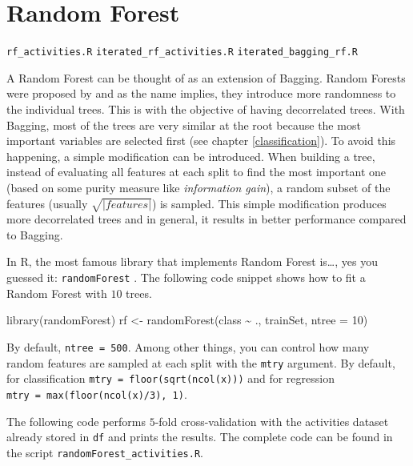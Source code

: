 \documentclass[
  11pt,
]{krantz}
\makeatletter
\newenvironment{Shaded}{\begin{snugshade}}{\end{snugshade}}
\newcommand{\AttributeTok}[1]{\textcolor[rgb]{0.61,0.61,0.61}{#1}}
\newcommand{\DecValTok}[1]{\textcolor[rgb]{0.06,0.06,0.06}{#1}}
\newcommand{\FunctionTok}[1]{\textcolor[rgb]{0,0,0}{#1}}
\newcommand{\NormalTok}[1]{#1}
\newcommand{\OtherTok}[1]{\textcolor[rgb]{0.37,0.37,0.37}{#1}}
\newcommand{\SpecialCharTok}[1]{\textcolor[rgb]{0,0,0}{#1}}
\newenvironment{kframe}{%
\medskip{}
\setlength{\fboxsep}{.8em}
 \def\at@end@of@kframe{}%
 \ifinner\ifhmode%
  \def\at@end@of@kframe{\end{minipage}}%
  \begin{minipage}{\columnwidth}%
 \fi\fi%
 \def\FrameCommand##1{\hskip\@totalleftmargin \hskip-\fboxsep
 \colorbox{shadecolor}{##1}\hskip-\fboxsep
     \hskip-\linewidth \hskip-\@totalleftmargin \hskip\columnwidth}%
 \MakeFramed {\advance\hsize-\width
   \@totalleftmargin\z@ \linewidth\hsize
   \@setminipage}}%
 {\par\unskip\endMakeFramed%
 \at@end@of@kframe}
\newenvironment{rmdblock}[1]
  {
  \begin{itemize}
  \renewcommand{\labelitemi}{
    \raisebox{-.7\height}[0pt][0pt]{
      {\setkeys{Gin}{width=3em,keepaspectratio}\texttt{[image: images/icons/\#1]}}
    }
  }
  \setlength{\fboxsep}{1em}
  \begin{kframe}
  \item
  }
  {
  \end{kframe}
  \end{itemize}
  }
\newenvironment{rmdfolder}
  {\begin{rmdblock}{folder}}
  {\end{rmdblock}}
\makeatother
\begin{document}
\hypertarget{random-forest}{%
\section{Random Forest}\label{random-forest}}

\begin{rmdfolder}
\texttt{rf\_activities.R} \texttt{iterated\_rf\_activities.R} \texttt{iterated\_bagging\_rf.R}
\end{rmdfolder}

A Random Forest can be thought of as an extension of Bagging. Random Forests were proposed by \citet{breimanRF} and as the name implies, they introduce more randomness to the individual trees. This is with the objective of having decorrelated trees. With Bagging, most of the trees are very similar at the root because the most important variables are selected first (see chapter \ref{classification}). To avoid this happening, a simple modification can be introduced. When building a tree, instead of evaluating all features at each split to find the most important one (based on some purity measure like \emph{information gain}), a random subset of the features (usually \(\sqrt{|features|}\)) is sampled. This simple modification produces more decorrelated trees and in general, it results in better performance compared to Bagging.

In R, the most famous library that implements Random Forest is\ldots, yes you guessed it: \texttt{randomForest} \citep{randomForest}. The following code snippet shows how to fit a Random Forest with \(10\) trees.

\begin{Shaded}
\begin{Highlighting}[]
\FunctionTok{library}\NormalTok{(randomForest)}
\NormalTok{rf }\OtherTok{\textless{}{-}} \FunctionTok{randomForest}\NormalTok{(class }\SpecialCharTok{\textasciitilde{}}\NormalTok{ ., trainSet, }\AttributeTok{ntree =} \DecValTok{10}\NormalTok{)}
\end{Highlighting}
\end{Shaded}

By default, \texttt{ntree\ =\ 500}. Among other things, you can control how many random features are sampled at each split with the \texttt{mtry} argument. By default, for classification \texttt{mtry\ =\ floor(sqrt(ncol(x)))} and for regression \texttt{mtry\ =\ max(floor(ncol(x)/3),\ 1)}.

The following code performs \(5\)-fold cross-validation with the activities dataset already stored in \texttt{df} and prints the results. The complete code can be found in the script \texttt{randomForest\_activities.R}.
\end{document}
